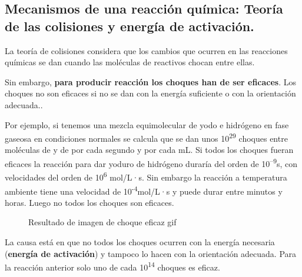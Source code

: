 \documentclass[
  spanish,
]{article}
\begin{document}
\hypertarget{mecanismos-de-una-reacciuxf3n-quuxedmica-teoruxeda-de-las-colisiones-y-energuxeda-de-activaciuxf3n.}{%
\subsection{Mecanismos de una reacción química: Teoría de las colisiones
y energía de
activación.}\label{mecanismos-de-una-reacciuxf3n-quuxedmica-teoruxeda-de-las-colisiones-y-energuxeda-de-activaciuxf3n.}}

La teoría de colisiones considera que los cambios que ocurren en las
reacciones químicas se dan cuando las moléculas de reactivos chocan
entre ellas.

Sin embargo, \textbf{para producir reacción los choques han de ser
eficaces}. Los choques no son eficaces si no se dan con la energía
suficiente o con la orientación adecuada..

Por ejemplo, si tenemos una mezcla equimolecular de yodo e hidrógeno en
fase gaseosa en condiciones normales se calcula que se dan unos
10\textsuperscript{29} choques entre moléculas de  y de 
por cada segundo y por cada mL. Si todos los choques fueran eficaces la
reacción para dar yoduro de hidrógeno duraría del orden de
10\textsuperscript{--9}s, con velocidades del orden de
10\textsuperscript{6} mol/L·s. Sin embargo la reacción a temperatura
ambiente tiene una velocidad de 10\textsuperscript{-4}mol/L·s y puede
durar entre minutos y horas. Luego no todos los choques son eficaces.

\begin{figure}
\centering
\hfill{}
\caption{Resultado de imagen de choque eficaz gif}
\end{figure}

La causa está en que no todos los choques ocurren con la energía
necesaria (\textbf{energía de activación}) y tampoco lo hacen con la
orientación adecuada. Para la reacción anterior solo uno de cada
10\textsuperscript{14} choques es eficaz.
\end{document}
